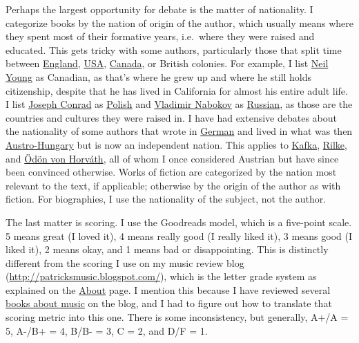 \documentclass[12pt]{article}
\begin{document}
Perhaps the largest opportunity for debate is the matter of nationality. I categorize books by the nation of origin of the author, which usually means where they spent most of their formative years, i.e.\ where they were raised and educated. This gets tricky with some authors, particularly those that split time between \hyperref[nation:England]{England}, \hyperref[nation:USA]{USA}, \hyperref[nation:Canada]{Canada}, or British colonies. For example, I list \hyperref[sec:Neil Young]{Neil Young} as Canadian, as that's where he grew up and where he still holds citizenship, despite that he has lived in California for almost his entire adult life. I list \hyperref[sec:Joseph Conrad]{Joseph Conrad} as \hyperref[nation:Poland]{Polish} and \hyperref[sec:Vladimir Nabokov]{Vladimir Nabokov} as \hyperref[nation:Russia]{Russian}, as those are the countries and cultures they were raised in. I have had extensive debates about the nationality of some authors that wrote in \hyperref[lang:German]{German} and lived in what was then \hyperref[nation:Austria]{Austro-Hungary} but is now an independent nation. This applies to \hyperref[sec:Franz Kafka]{Kafka}, \hyperref[sec:Rainer Maria Rilke]{Rilke}, and \hyperref[sec:Oedoen von Horvath]{Ödön von Horváth}, all of whom I once considered Austrian but have since been convinced otherwise. Works of fiction are categorized by the nation most relevant to the text, if applicable; otherwise by the origin of the author as with fiction. For biographies, I use the nationality of the subject, not the author.

The last matter is scoring. I use the Goodreads model, which is a five-point scale. 5 means great (I loved it), 4 means really good (I really liked it), 3 means good (I liked it), 2 means okay, and 1 means bad or disappointing. This is distinctly different from the scoring I use on my music review blog (\url{http://patricksmusic.blogspot.com/}), which is the letter grade system as explained on the \href{http://patricksmusic.blogspot.com/p/about.html}{About} page. I mention this because I have reviewed several \href{http://patricksmusic.blogspot.com/search/label/book%20review}{books about music} on the blog, and I had to figure out how to translate that scoring metric into this one. There is some inconsistency, but generally, A+/A = 5, A-/B+ = 4, B/B- = 3, C = 2, and D/F = 1.


\tableofcontents \label{sec:toc}
\end{document}
